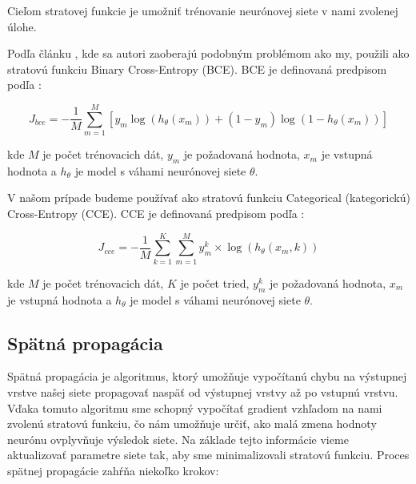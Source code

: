 Cieľom stratovej funkcie je umožniť trénovanie neurónovej siete v nami zvolenej úlohe.

Podľa článku \cite{takada2023genelive}, kde sa autori zaoberajú podobným problémom ako my, použili ako stratovú funkciu Binary Cross-Entropy (BCE). BCE je definovaná predpisom podľa \cite{Yaoshiang2020ce}:

\begin{equation}
  J_{bce} = -\frac{1}{M}\sum_{m=1}^{M} \left[ y_{m} \log\left( h_{\theta}(x_{m}) \right) + (1 - y_{m}) \log\left( 1 - h_{\theta}(x_{m}) \right) \right]
\end{equation}

kde $M$ je počet trénovacich dát, $y_{m}$ je požadovaná hodnota, $x_m$ je vstupná hodnota a $h_{\theta}$ je model s váhami neurónovej siete $\theta$.

V našom prípade budeme používať ako stratovú funkciu Categorical (kategorickú) Cross-Entropy (CCE). CCE je definovaná predpisom podľa \cite{Yaoshiang2020ce}:
  
\begin{equation} J_{cce}=-\frac {1}{M}\sum \limits _{k=1}^{K} \sum \limits _{m=1}^{M} {y_{m}^{k}\times \log \left ({h_{\theta }\left ({x_{m},k }\right) }\right)}
\end{equation}

kde $M$ je počet trénovacich dát, $K$ je počet tried, $y_{m}^{k}$ je požadovaná hodnota, $x_m$ je vstupná hodnota a $h_{\theta}$ je model s váhami neurónovej siete $\theta$.

\subsection{Spätná propagácia}

Spätná propagácia je algoritmus, ktorý umožňuje vypočítanú chybu na výstupnej vrstve našej siete propagovať naspäť od výstupnej vrstvy až po vstupnú vrstvu.
Vďaka tomuto algoritmu sme schopný vypočítať gradient vzhľadom na nami zvolenú
stratovú funkciu, čo nám umožňuje určiť, ako malá zmena hodnoty neurónu ovplyvňuje
výsledok siete. Na základe tejto informácie vieme aktualizovať parametre siete tak, aby
sme minimalizovali stratovú funkciu. Proces spätnej propagácie zahŕňa niekoľko krokov:

